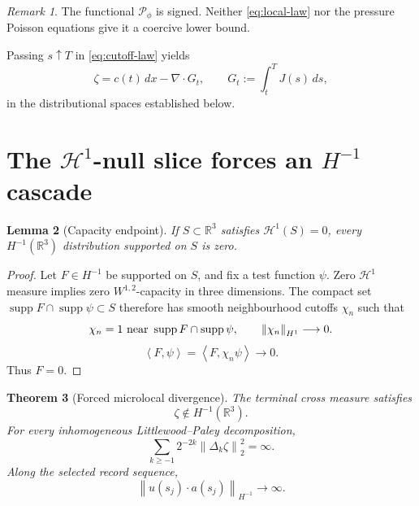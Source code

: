 \documentclass[11pt]{article}
\newtheorem{theorem}{Theorem}
\newtheorem{lemma}[theorem]{Lemma}
\theoremstyle{remark}
\newtheorem{remark}[theorem]{Remark}
\newcommand{\R}{\mathbb R}
\newcommand{\ip}[2]{\left\langle #1,#2\right\rangle}
\newcommand{\norm}[1]{\left\|#1\right\|}
\newcommand{\supp}{\operatorname{supp}}
\newcommand{\HH}{\mathcal H}
\begin{document}
\begin{remark}
The functional \(\mathcal P_\phi\) is signed.  Neither
\eqref{eq:local-law} nor the pressure Poisson equations give it a
coercive lower bound.
\end{remark}

Passing \(s\uparrow T\) in \eqref{eq:cutoff-law} yields
\begin{equation}
 \label{eq:terminal-current}
 \boxed{
 \zeta=c(t)\,dx-\nabla\cdot G_t,
 \qquad
 G_t:=\int_t^T J(s)\,ds,
 }
\end{equation}
in the distributional spaces established below.

\section{The \texorpdfstring{\(\HH^1\)}{H1}-null slice forces an
\texorpdfstring{\(H^{-1}\)}{H-1} cascade}

\begin{lemma}[Capacity endpoint]
\label{lem:capacity}
If \(S\subset\R^3\) satisfies \(\HH^1(S)=0\), every
\(H^{-1}(\R^3)\) distribution supported on \(S\) is zero.
\end{lemma}

\begin{proof}
Let \(F\in H^{-1}\) be supported on \(S\), and fix a test function
\(\psi\).  Zero \(\HH^1\) measure implies zero \(W^{1,2}\)-capacity in
three dimensions.  The compact set
\(\supp F\cap\supp\psi\subset S\) therefore has smooth neighbourhood
cutoffs \(\chi_n\) such that
\[
 \chi_n=1\ \hbox{near }\supp F\cap\supp\psi,
 \qquad
 \norm{\chi_n}_{H^1}\longrightarrow0.
\]
\[
 \ip{F}{\psi}=\ip{F}{\chi_n\psi}\longrightarrow0.
\]
Thus \(F=0\).
\end{proof}

\begin{theorem}[Forced microlocal divergence]
\label{thm:hminus}
The terminal cross measure satisfies
\begin{equation}
 \label{eq:not-hminus}
 \boxed{\zeta\notin H^{-1}(\R^3).}
\end{equation}
For every inhomogeneous Littlewood--Paley decomposition,
\begin{equation}
 \label{eq:dyadic-divergence}
 \sum_{k\geq-1}2^{-2k}\norm{\Delta_k\zeta}_2^2=\infty.
\end{equation}
Along the selected record sequence,
\begin{equation}
 \label{eq:preterminal-divergence}
 \boxed{
 \norm{u(s_j)\cdot a(s_j)}_{H^{-1}}
 \longrightarrow\infty.
 }
\end{equation}
\end{theorem}
\end{document}

